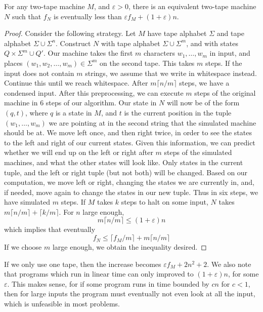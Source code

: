 \begin{theorem}
    For any two-tape machine $M$, and $\varepsilon > 0$, there is an equivalent two-tape machine $N$ such that $f_N$ is eventually less than $\varepsilon f_M + (1 + \varepsilon) n$.
\end{theorem}
\begin{proof}
    Consider the following strategy. Let $M$ have tape alphabet $\Sigma$ and tape alphabet $\Sigma \cup \Sigma^n$. Construct $N$ with tape alphabet $\Sigma \cup \Sigma^m$, and with states $Q \times \Sigma^m \cup Q'$. Our machine takes the first $m$ characters $w_1, \dots, w_m$ in input, and places $(w_1, w_2, \dots, w_m) \in \Sigma^m$ on the second tape. This takes $m$ steps. If the input does not contain $m$ strings, we assume that we write in whitespace instead. Continue this until we reach whitespace. After $m \lceil n/m \rceil$ steps, we have a condensed input. After this preprocessing, we can execute $m$ steps of the original machine in 6 steps of our algorithm. Our state in $N$ will now be of the form $(q,t)$, where $q$ is a state in $M$, and $t$ is the current position in the tuple $(w_1, \dots, w_m)$ we are pointing at in the second string that the simulated machine should be at. We move left once, and then right twice, in order to see the states to the left and right of our current states. Given this information, we can predict whether we will end up on the left or right after $m$ steps of the simulated machines, and what the other states will look like. Only states in the current tuple, and the left or right tuple (but not both) will be changed. Based on our computation, we move left or right, changing the states we are currently in, and, if needed, move again to change the states in our new tuple. Thus in six steps, we have simulated $m$ steps. If $M$ takes $k$ steps to halt on some input, $N$ takes $m \lceil n/m \rceil + \lceil k/m \rceil$. For $n$ large enough,
    \[ m \lceil n/m \rceil \leq (1 + \varepsilon) n \]
    which implies that eventually
    \[ f_N \leq \lceil f_M/m \rceil + m \lceil n/m \rceil \]
    If we choose $m$ large enough, we obtain the inequality desired.
\end{proof}

If we only use one tape, then the increase becomes $\varepsilon f_M + 2 n^2 + 2$. We also note that programs which run in linear time can only improved to $(1 + \varepsilon) n$, for some $\varepsilon$. This makes sense, for if some program runs in time bounded by $cn$ for $c < 1$, then for large inputs the program must eventually not even look at all the input, which is unfeasible in most problems.

